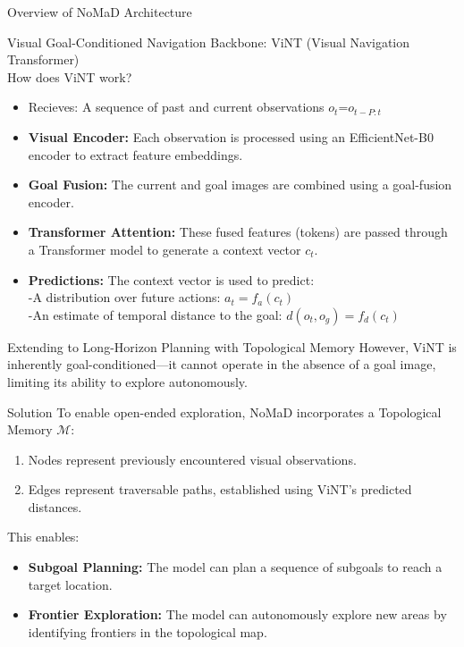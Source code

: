\documentclass{beamer}
\begin{document}
\begin{frame}{Overview of NoMaD Architecture}
    \begin{block}{Visual Goal-Conditioned Navigation}
        Backbone: ViNT (Visual Navigation Transformer)\\
        How does ViNT work?
        \begin{itemize}
            \item Recieves: A sequence of past and current observations $o_t$=$o_{t-P:t}$
            \item \textbf{Visual Encoder:} Each observation is processed using an EfficientNet-B0 encoder to extract feature embeddings.
            \pause
            \item \textbf{Goal Fusion:} The current and goal images are combined using a goal-fusion encoder.
            \item \textbf{Transformer Attention:} These fused features (tokens) are passed through a Transformer model to generate a context vector $c_t$.
            \item \textbf{Predictions:} The context vector is used to predict:\\
            -A distribution over future actions: $a_t = f_a(c_t)$\\
            -An estimate of temporal distance to the goal: $d(o_t, o_g) = f_d(c_t)$
        \end{itemize}
    \end{block}
\end{frame}
\begin{frame}{Extending to Long-Horizon Planning with Topological Memory}
    \alert{However, ViNT is inherently goal-conditioned—it cannot operate in the absence
    of a goal image, limiting its ability to explore autonomously.}
    \pause
    \begin{block}{Solution}
        To enable open-ended exploration, NoMaD incorporates a Topological Memory $\mathcal{M}$:
        \begin{enumerate}
            \item Nodes represent previously encountered visual observations.
            \item Edges represent traversable paths, established using ViNT's predicted distances.
        \end{enumerate}
        This enables:
        \begin{itemize}
            \item \textbf{Subgoal Planning:} The model can plan a sequence of subgoals to reach a target location.
            \item \textbf{Frontier Exploration:} The model can autonomously explore new areas by identifying frontiers in the topological map.
        \end{itemize}
    \end{block}
\end{frame}
\end{document}

